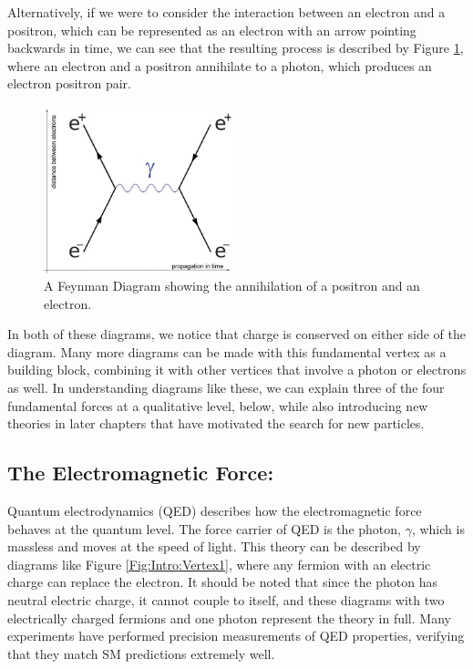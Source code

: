 Alternatively, if we were to consider the interaction between an electron and a positron, which can be represented as an electron with an arrow pointing backwards in time, we can see that the resulting process is described by Figure \ref{Fig:Intro:Feynman2}, where an electron and a positron annihilate to a photon, which produces an electron positron pair.
\begin{figure}[h]
    \centering
        \includegraphics[width=0.49\textwidth]{F1/FeynDiag2}
        \caption{A Feynman Diagram showing the annihilation of a positron and an electron.}
        \label{Fig:Intro:Feynman2}
\end{figure}
In both of these diagrams, we notice that charge is conserved on either side of the diagram. Many more diagrams can be made with this fundamental vertex as a building block, combining it with other vertices that involve a photon or electrons as well. In understanding diagrams like these, we can explain three of the four fundamental forces at a qualitative level, below, while also introducing new theories in later chapters that have motivated the search for new particles.

\subsection{The Electromagnetic Force:}
Quantum electrodynamics (QED) describes how the electromagnetic force behaves at the quantum level. The force carrier of QED is the photon, $\gamma$, which is massless and moves at the speed of light. This theory can be described by diagrams like Figure \ref{Fig:Intro:Vertex1}, where any fermion with an electric charge can replace the electron. It should be noted that since the photon has neutral electric charge, it cannot couple to itself, and these diagrams with two electrically charged fermions and one photon represent the theory in full. Many experiments have performed precision measurements of QED properties, verifying that they match SM predictions extremely well.

